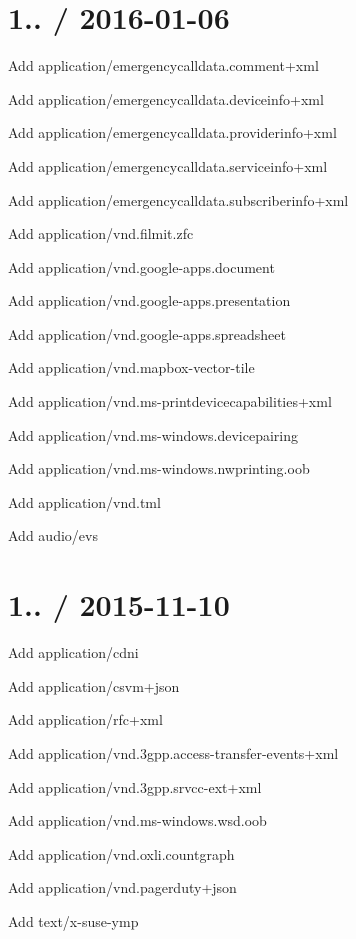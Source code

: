 \section*{1.. / 2016-\/01-\/06 }


\begin{DoxyItemize}
\item Add {\ttfamily application/emergencycalldata.\+comment+xml}
\item Add {\ttfamily application/emergencycalldata.\+deviceinfo+xml}
\item Add {\ttfamily application/emergencycalldata.\+providerinfo+xml}
\item Add {\ttfamily application/emergencycalldata.\+serviceinfo+xml}
\item Add {\ttfamily application/emergencycalldata.\+subscriberinfo+xml}
\item Add {\ttfamily application/vnd.\+filmit.\+zfc}
\item Add {\ttfamily application/vnd.\+google-\/apps.\+document}
\item Add {\ttfamily application/vnd.\+google-\/apps.\+presentation}
\item Add {\ttfamily application/vnd.\+google-\/apps.\+spreadsheet}
\item Add {\ttfamily application/vnd.\+mapbox-\/vector-\/tile}
\item Add {\ttfamily application/vnd.\+ms-\/printdevicecapabilities+xml}
\item Add {\ttfamily application/vnd.\+ms-\/windows.\+devicepairing}
\item Add {\ttfamily application/vnd.\+ms-\/windows.\+nwprinting.\+oob}
\item Add {\ttfamily application/vnd.\+tml}
\item Add {\ttfamily audio/evs}
\end{DoxyItemize}

\section*{1.. / 2015-\/11-\/10 }


\begin{DoxyItemize}
\item Add {\ttfamily application/cdni}
\item Add {\ttfamily application/csvm+json}
\item Add {\ttfamily application/rfc+xml}
\item Add {\ttfamily application/vnd.\+3gpp.\+access-\/transfer-\/events+xml}
\item Add {\ttfamily application/vnd.\+3gpp.\+srvcc-\/ext+xml}
\item Add {\ttfamily application/vnd.\+ms-\/windows.\+wsd.\+oob}
\item Add {\ttfamily application/vnd.\+oxli.\+countgraph}
\item Add {\ttfamily application/vnd.\+pagerduty+json}
\item Add {\ttfamily text/x-\/suse-\/ymp}
\end{DoxyItemize}

